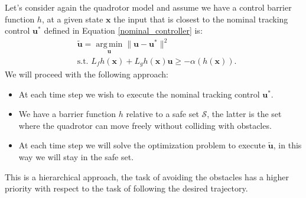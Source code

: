 \documentclass[10pt, a4paper]{report}
\begin{document}
Let's consider again the quadrotor model and assume we have a control barrier function $h$, at a given state $\mathbf x$ the input that is closest to the nominal tracking control $\mathbf u^*$ defined in Equation \eqref{nominal_controller} is:\begin{align}
    &\tilde{\mathbf u} = \operatorname*{arg\,min}_{\mathbf u}\|\mathbf u-\mathbf u^*\|^2\\ 
    &\text{s.t. } L_fh(\mathbf x)+L_gh(\mathbf x)\mathbf u\ge-\alpha(h(\mathbf x)).
\end{align}
We will proceed with the following approach:\begin{itemize}
    \item At each time step we wish to execute the nominal tracking control $\mathbf u^*$.
    \item We have a barrier function $h$ relative to a safe set $\mathcal S$, the latter is the set where the quadrotor can move freely without colliding with obstacles.
    \item At each time step we will solve the optimization problem to execute $\tilde{\mathbf u}$, in this way we will stay in the safe set.
\end{itemize}
This is a hierarchical approach, the task of avoiding the obstacles has a higher priority with respect to the task of following the desired trajectory.
\end{document}
